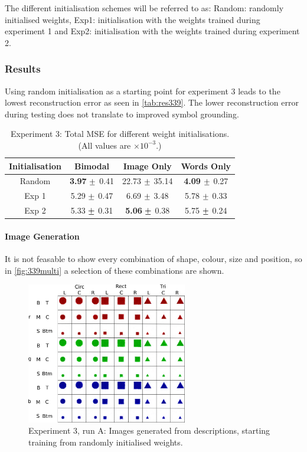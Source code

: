 The different initialisation schemes will be referred to as: Random: randomly initialised weights, Exp1: initialisation with the weights trained during experiment 1 and Exp2: initialisation with the weights trained during experiment 2.

\subsubsection{Results}
Using random initialisation as a starting point for experiment 3 leads to the lowest reconstruction error as seen in \autoref{tab:res339}. The lower reconstruction error during testing does not translate to improved symbol grounding.


\begin{table}[h!]
\centering
	\begin{tabular}{|c|c|c|c|}
	\hline
	\textbf{Initialisation} & 	\textbf{Bimodal} & \textbf{Image Only} 	& 	\textbf{Words Only} \\ \hline
	Random	&	\textbf{3.97}	$\mypm$	0.41	&	22.73	$\mypm$	35.14	&	\textbf{4.09}	$\mypm$	0.27\\ \hline
	Exp 1 	&	5.29	$\mypm$	0.47	&	6.69	$\mypm$	3.48	&	5.78	$\mypm$	0.33	\\ \hline
	Exp 2 	&	5.33	$\mypm$	0.31	&	\textbf{5.06}	$\mypm$	0.38	&	5.75	$\mypm$	0.24	\\ \hline

	\end{tabular}
\caption{Experiment 3: Total MSE for different weight initialisations. (All values are $\times10^{-3}$.)}
\label{tab:res339}
\end{table}


\paragraph{Image Generation}
It is not feasable to show every combination of shape, colour, size and position, so in \autoref{fig:339multi} a selection of these combinations are shown.

\begin{figure}[h]
\centering
\includegraphics[width=0.625\textwidth]{Figs/shapes/multiword339.png}
\caption{Experiment 3, run A: Images generated from descriptions, starting training from randomly initialised weights.}
\label{fig:339multi}
\end{figure}

